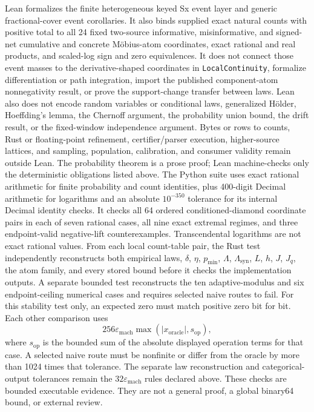 \documentclass[11pt]{article}
\theoremstyle{definition}
\begin{document}
Lean formalizes the finite heterogeneous keyed Sx event layer and generic fractional-cover event
corollaries.  It also binds supplied exact natural counts with positive total to all 24 fixed
two-source informative, misinformative, and signed-net cumulative and concrete M{\"o}bius-atom
coordinates, exact rational and real products, and scaled-log sign and zero equivalences.  It does
not connect those event masses to the derivative-shaped coordinates in
\texttt{LocalContinuity}, formalize differentiation or path integration, import the published
component-atom nonnegativity result, or prove the support-change transfer between laws.  Lean also
does not encode random variables or conditional laws,
generalized H{\"o}lder, Hoeffding's lemma, the Chernoff argument, the probability union bound, the
drift result, or the fixed-window independence argument.  Bytes or rows to counts, Rust or
floating-point refinement, certifier/parser execution, higher-source lattices, and sampling,
population, calibration, and consumer validity remain outside Lean.  The probability theorem is a prose proof; Lean
machine-checks only the deterministic obligations listed above.
The Python suite uses exact rational arithmetic for finite probability and count identities, plus
400-digit Decimal arithmetic for logarithms and an absolute $10^{-350}$ tolerance for its internal
Decimal identity checks.  It checks all 64 ordered conditioned-diamond
coordinate pairs in each of seven rational cases, all nine exact extremal regimes, and three
endpoint-valid negative-lift counterexamples.
Transcendental logarithms are not exact rational values.  From each local count-table pair, the
Rust test independently reconstructs both empirical
laws, $\delta$, $\eta$, $p_{\min}$, $\Lambda$, $\Lambda_{\mathrm{syn}}$, $L$, $h$, $J$, $J_q$,
the atom family, and every stored bound before it checks the implementation outputs.  A separate
bounded test reconstructs the ten adaptive-modulus and six endpoint-ceiling numerical cases and
requires selected naive routes to fail.  For this stability test only, an expected zero must match
positive zero bit for bit.  Each other comparison uses
\begin{equation}
  256\varepsilon_{\mathrm{mach}}
  \max(\lvert x_{\mathrm{oracle}}\rvert,s_{\mathrm{op}}),
\end{equation}
where $s_{\mathrm{op}}$ is the bounded sum of the absolute displayed operation terms for that
case.  A selected naive route must be nonfinite or differ from the oracle by more than 1024 times
that tolerance.  The separate law reconstruction and categorical-output tolerances remain the
$32\varepsilon_{\mathrm{mach}}$ rules declared above.  These checks are bounded executable
evidence.  They are not a general proof, a global binary64 bound, or external review.
\end{document}
